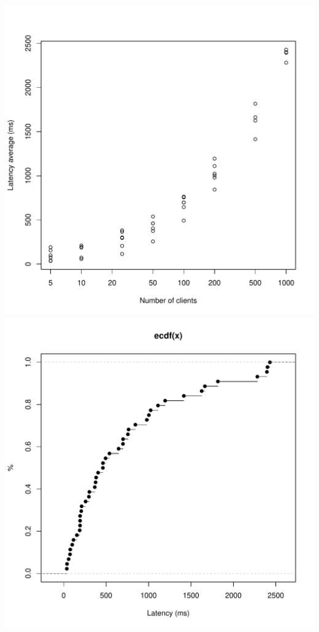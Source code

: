 \documentclass[10pt]{article}
\begin{document}
\begin{center}
\includegraphics[scale=0.6]{avgs.pdf}
\\
\includegraphics[scale=0.6]{cdf.pdf}
\end{center}
\end{document}
